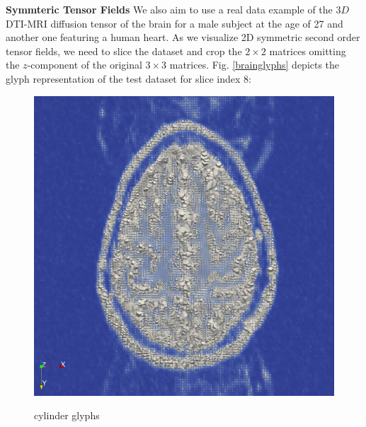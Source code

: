 \documentclass{scrartcl}
\begin{document}
\textbf{Symmteric Tensor Fields}
We also aim to use a real data example of the $3D$ DTI-MRI diffusion tensor of the brain for a male subject at the age of 27 and another one featuring a human heart. As we visualize 2D symmetric second order tensor fields, we need to slice the dataset and crop the $2{\times}2$ matrices omitting the $z$-component of the original $3{\times}3$ matrices. Fig. \ref{brainglyphs} depicts the glyph representation of the test dataset for slice index $8$:
\begin{figure}[!t]
\centering
  \begin{minipage}{0.4\textwidth}
    \includegraphics[width=\textwidth]{img/brain_cyl_glyphs.png}
    \label{a)}
    \caption*{cylinder glyphs}
  \end{minipage}
  \begin{minipage}{0.4\textwidth}

\end{minipage}
\end{figure}
\end{document}
